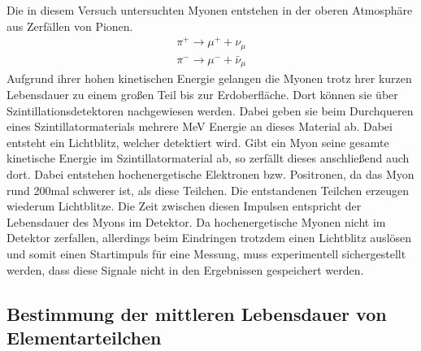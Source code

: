 %
Die in diesem Versuch untersuchten Myonen entstehen in der oberen Atmosphäre aus Zerfällen von Pionen.
%
\begin{align}
  \pi^+\rightarrow\mu^++\nu_\mu \\
  \pi^-\rightarrow\mu^-+\bar{\nu}_\mu
\end{align}
%
Aufgrund ihrer hohen kinetischen Energie gelangen die Myonen trotz hrer kurzen Lebensdauer zu einem großen Teil bis zur
Erdoberfläche. Dort können sie über Szintillationsdetektoren nachgewiesen werden. Dabei geben sie beim Durchqueren eines
Szintillatormaterials mehrere MeV Energie an dieses Material ab. Dabei entsteht ein Lichtblitz, welcher detektiert wird.
Gibt ein Myon seine gesamte kinetische Energie im Szintillatormaterial ab, so zerfällt dieses anschließend auch dort.
Dabei entstehen hochenergetische Elektronen bzw. Positronen, da das Myon rund 200mal schwerer ist, als diese Teilchen.
Die entstandenen Teilchen erzeugen wiederum Lichtblitze. Die Zeit zwischen diesen Impulsen entspricht der Lebensdauer
des Myons im Detektor. Da hochenergetische Myonen nicht im Detektor zerfallen, allerdings beim Eindringen trotzdem einen
Lichtblitz auslösen und somit einen Startimpuls für eine Messung, muss experimentell sichergestellt werden, dass diese
Signale nicht in den Ergebnissen gespeichert werden.
%
\subsection{Bestimmung der mittleren Lebensdauer von Elementarteilchen}

